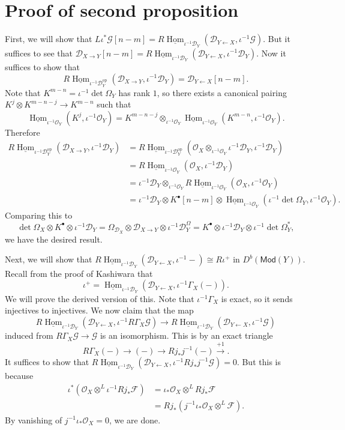 \documentclass[leqno, openany]{memoir}
\theoremstyle{definition}
\theoremstyle{remark}
\theoremstyle{plain}
\theoremstyle{definition}
\theoremstyle{remark}
\newcommand{\mc}[1]{\mathcal{#1}}
\newcommand{\mr}[1]{\mathrm{#1}}
\newcommand{\ms}[1]{\mathsf{#1}}
\newcommand{\ul}[1]{\underline{#1}}
\DeclareMathOperator{\Hom}{Hom}
\begin{document}
\section{Proof of second proposition}

First, we will show that $L \iota^* \mc{G} [n-m] = R \ul{\Hom}_{\iota^{-1} \mc{D}_Y} (\mc{D}_{Y \gets X}, \iota^{-1} \mc{G})$. But it suffices to see that $\mc{D}_{X \to Y} [n-m] = R \ul{\Hom}_{\iota^{-1} \mc{D}_Y} (\mc{D}_{Y \gets X}, \iota^{-1} \mc{D}_Y)$. Now it suffices to show that
\[ R \ul{\Hom}_{\iota^{-1} \mc{D}_Y^{\mr{op}}}(\mc{D}_{X \to Y}, \iota^{-1} \mc{D}_Y) = \mc{D}_{Y \gets X}[n-m]. \]
Note that $K^{m-n} = \iota^{-1} \det \Omega_Y$ has rank $1$, so there exists a canonical pairing $K^j \otimes K^{m-n-j} \to K^{m-n}$ such that
\[ \ul{\Hom}_{\iota^{-1} \mc{O}_Y}(K^j, \iota^{-1} \mc{O}_Y) = K^{m-n-j} \otimes_{\iota^{-1} \mc{O}_Y} \ul{\Hom}_{\iota^{-1} \mc{O}_Y} (K^{m-n}, \iota^{-1} \mc{O}_Y). \]
Therefore
\begin{align*}
    R \ul{\Hom}_{\iota^{-1} \mc{D}_Y^{\mr{op}}} (\mc{D}_{X \to Y}, \iota^{-1} \mc{D}_Y) &= R\ul{\Hom}_{\iota^{-1} \mc{D}_Y^{\mr{op}}}(\mc{O}_X \otimes_{\iota^{-1} \mc{O}_Y} \iota^{-1} \mc{D}_Y, \iota^{-1} \mc{D}_Y) \\
    &= R \ul{\Hom}_{\iota^{-1} \mc{O}_Y} (\mc{O}_X, \iota^{-1} \mc{D}_Y) \\
    &= \iota^{-1} \mc{D}_Y \otimes_{\iota^{-1} \mc{O}_Y} R\ul{\Hom}_{\iota^{-1} \mc{O}_Y}(\mc{O}_X, \iota^{-1} \mc{O}_Y) \\
    &= \iota^{-1} \mc{D}_Y \otimes K^{\bullet}[n-m] \otimes \ul{\Hom}_{\iota^{-1} \mc{O}_Y}(\iota^{-1} \det \Omega_Y, \iota^{-1} \mc{O}_Y).
\end{align*}
Comparing this to
\[ \det \Omega_X \otimes K^{\bullet} \otimes \iota^{-1} \mc{D}_Y = \Omega_{\mc{D}_X} \otimes \mc{D}_{X \to Y} \otimes \iota^{-1} \mc{D}_Y^{\Omega} = K^{\bullet} \otimes \iota^{-1} \mc{D}_Y \otimes \iota^{-1} \det \Omega_Y^*, \]
we have the desired result.

Next, we will show that $R \ul{\Hom}_{\iota^{-1} \mc{D}_Y} (\mc{D}_{Y \gets X}, \iota^{-1} -) \cong R \iota^+$ in $D^b(\ms{Mod}(Y))$. Recall from the proof of Kashiwara that
\[ \iota^+ = \ul{\Hom}_{\iota^{-1} \mc{D}_Y} (\mc{D}_{Y \gets X}, \iota^{-1} \Gamma_X(-)). \]
We will prove the derived version of this. Note that $\iota^{-1} \Gamma_X$ is exact, so it sends injectives to injectives. We now claim that the map
\[ R \ul{\Hom}_{\iota^{-1} \mc{D}_Y}(\mc{D}_{Y \gets X}, \iota^{-1} R \Gamma_X \mc{G}) \to R \ul{\Hom}_{\iota^{-1} \mc{D}_Y}(\mc{D}_{Y \gets X}, \iota^{-1} \mc{G}) \]
induced from $R \Gamma_X \mc{G} \to \mc{G}$ is an isomorphism. This is by an exact triangle
\[ R \Gamma_X(-) \to (-) \to R j_* j^{-1}(-) \xrightarrow{+1}. \]
It suffices to show that $R \ul{\Hom}_{\iota^{-1} \mc{D}_Y}(\mc{D}_{Y \gets X}, \iota^{-1} R j_* j^{-1} \mc{G}) = 0$. But this is because
\begin{align*}
    \iota^* (\mc{O}_X \otimes^L \iota^{-1} R j_* \mc{F}) &= \iota_* \mc{O}_X \otimes^L R j_* \mc{F} \\
    &= R j_* (j^{-1} \iota_* \mc{O}_X \otimes^L \mc{F}).
\end{align*}
By vanishing of $j^{-1} \iota_* \mc{O}_X = 0$, we are done.
\end{document}
